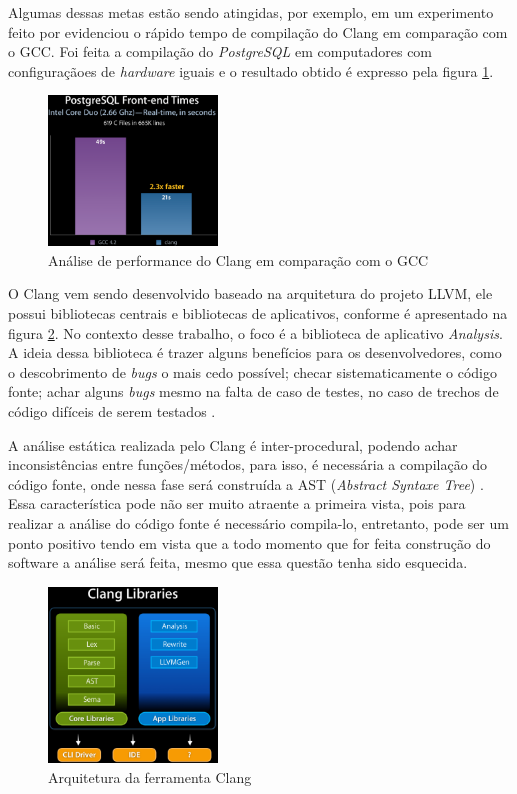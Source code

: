 Algumas dessas metas estão sendo atingidas, por exemplo, em um experimento feito por \cite{naroff2009} evidenciou o rápido
tempo de compilação do Clang em comparação com o GCC. Foi feita a compilação do \textit{PostgreSQL} em computadores com 
configuraçãoes de \textit{hardware} iguais e o resultado obtido é expresso pela figura \ref{clang_gcc}.

\begin{figure}[h]
  \centering
  \includegraphics[width=0.4\textwidth]
      {figuras/clang_gcc.eps}
  \caption{Análise de performance do Clang em comparação com o GCC}
  \label{clang_gcc}
\end{figure}

O Clang vem sendo desenvolvido baseado na arquitetura do projeto LLVM, ele possui bibliotecas centrais e bibliotecas de 
aplicativos, conforme é apresentado na figura \ref{clang_arch}. No contexto desse trabalho, o foco é a biblioteca de aplicativo
\textit{Analysis}. A ideia dessa biblioteca é trazer alguns benefícios para os desenvolvedores, como o descobrimento de 
\textit{bugs} o mais cedo possível; checar sistematicamente o código fonte; achar alguns \textit{bugs} mesmo na falta de caso
de testes, no caso de trechos de código difíceis de serem testados \cite{kremenek2009}. 

A análise estática realizada pelo Clang é inter-procedural, podendo achar inconsistências entre funções/métodos, para isso,
é necessária a compilação do código fonte, onde nessa fase será construída a AST (\textit{Abstract Syntaxe Tree})
\cite{kremenek2009}. Essa característica pode não ser muito atraente a primeira vista, pois para realizar a análise do código 
fonte é necessário compila-lo, entretanto, pode ser um ponto positivo tendo em vista que a todo momento que for feita 
construção do software a análise será feita, mesmo que essa questão tenha sido esquecida.

\begin{figure}[h]
  \centering
  \includegraphics[width=0.4\textwidth]
      {figuras/clang_arch.eps}
  \caption{Arquitetura da ferramenta Clang}
  \label{clang_arch}
\end{figure}

